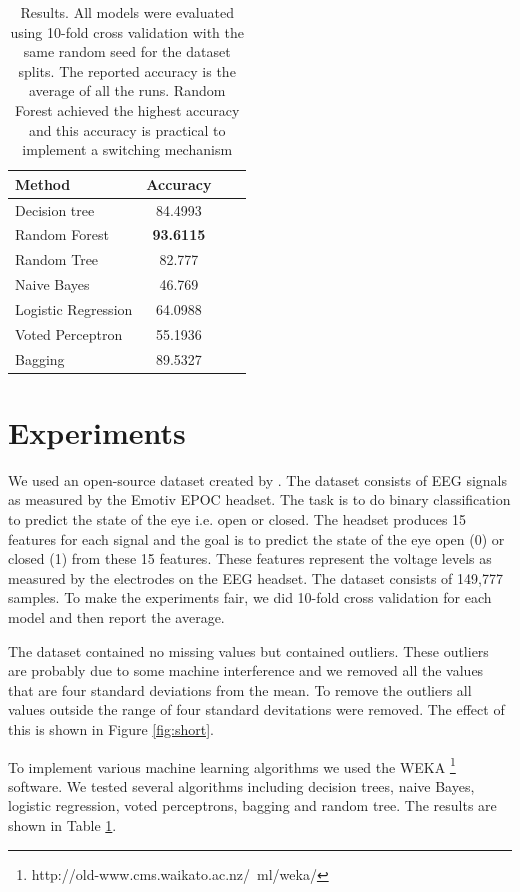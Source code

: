 \documentclass[10pt,twocolumn,letterpaper]{article}
\begin{document}
\begin{table}
  \centering
  \begin{tabular}{@{}lc@{}lc@{}}
    \toprule
    Method & Accuracy \\
    \midrule
    Decision tree & 84.4993 \\
    Random Forest & \textbf{93.6115} \\
    Random Tree & 82.777 \\
    Naive Bayes & 46.769 \\
    Logistic Regression & 64.0988 \\
    Voted Perceptron & 55.1936 \\
    Bagging & 89.5327 \\
    \bottomrule
  \end{tabular}
  \caption{Results. All models were evaluated using 10-fold cross validation with the same random seed for the dataset splits. The reported accuracy is the average of all the runs. Random Forest achieved the highest accuracy and this accuracy is practical to implement a switching mechanism}
  \label{tab:example}
\end{table}

\section{Experiments}

We used an open-source dataset created by \cite{paper5}. The dataset consists of EEG signals as measured by the Emotiv EPOC headset. The task is to do binary classification to predict the state of the eye i.e. open or closed. The headset produces 15 features for each signal and the goal is to predict the state of the eye open (0) or closed (1) from these 15 features. These features represent the voltage levels as measured by the electrodes on the EEG headset. The dataset consists of 149,777 samples. To make the experiments fair, we did 10-fold cross validation for each model and then report the average.

The dataset contained no missing values but contained outliers. These outliers are probably due to some machine interference and we removed all the values that are four standard deviations from the mean. To remove the outliers all values outside the range of four standard devitations were removed. The effect of this is shown in Figure \ref{fig:short}.

To implement various machine learning algorithms we used the WEKA \footnote{http://old-www.cms.waikato.ac.nz/~ml/weka/} software. We tested several algorithms including decision trees, naive Bayes, logistic regression, voted perceptrons, bagging and random tree. The results are shown in Table \ref{tab:example}.
\end{document}
